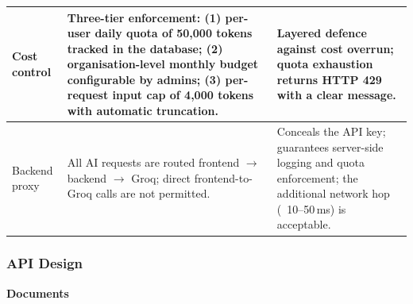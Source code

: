 \documentclass{article}
\begin{document}
{\begin{tabularx}{\textwidth}{|>{\hsize=0.5\hsize\raggedright\arraybackslash}X|>{\hsize=0.7\hsize\raggedright\arraybackslash}X|>{\hsize=0.8\hsize\raggedright\arraybackslash}X|}
    \hline
    Cost control & Three-tier enforcement: (1) per-user daily quota of 50,000 tokens tracked in the database; (2) organisation-level monthly budget configurable by admins; (3) per-request input cap of 4,000 tokens with automatic truncation. & Layered defence against cost overrun; quota exhaustion returns HTTP 429 with a clear message. \\
    \hline
    Backend proxy & All AI requests are routed frontend $\rightarrow$ backend $\rightarrow$ Groq; direct frontend-to-Groq calls are not permitted. & Conceals the API key; guarantees server-side logging and quota enforcement; the additional network hop (~10--50\,ms) is acceptable. \\
    \hline
\end{tabularx}
}









\newpage
\subsubsection{API Design}
\vspace{5pt}
\noindent\textbf{Documents}
\vspace{5pt}
\end{document}
